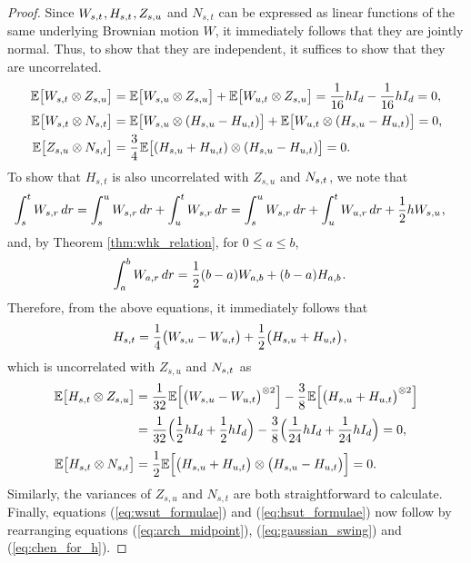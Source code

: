 \documentclass[sn-mathphys-num]{sn-jnl}%
\newcommand{\E}{\mathbb{E}}
\newcommand{\m}{\hspace{0.25mm}}
\begin{document}
\begin{proof}
Since $W_{s,t}\m, H_{s,t}\m, Z_{s,u}$ and $N_{s,t}$ can be expressed as linear functions of the same underlying Brownian motion $W$, it immediately follows that they are jointly normal. Thus, to show that they are independent, it suffices to show that they are uncorrelated.
\begin{align*}
\E\big[W_{s,t}\otimes Z_{s,u}\big] & = \E\big[W_{s,u}\otimes Z_{s,u}\big] +  \E\big[W_{u,t}\otimes Z_{s,u}\big] = \frac{1}{16}hI_d - \frac{1}{16}hI_d = 0,\\
\E\big[W_{s,t}\otimes N_{s,t}\big] & = \E\big[W_{s,u}\otimes (H_{s,u} - H_{u,t})\big] +  \E\big[W_{u,t}\otimes (H_{s,u} - H_{u,t})\big] = 0,\\
\E\big[Z_{s,u}\otimes N_{s,t}\big] & = \frac{3}{4}\m\E\big[(H_{s,u} + H_{u,t})\otimes (H_{s,u} - H_{u,t})\big] = 0.
\end{align*}
To show that $H_{s,t}$ is also uncorrelated with $Z_{s,u}$ and $N_{s,t}\m$, we note that
\begin{align*}
\int_s^t W_{s,r}\,dr & = \int_s^u W_{s,r}\,dr + \int_u^t W_{s,r}\,dr = \int_s^u W_{s,r}\,dr + \int_u^t W_{u,r}\,dr + \frac{1}{2}h W_{s,u}\m,
\end{align*}
and, by Theorem \ref{thm:whk_relation}, for $0\leq a\leq b$,
\begin{align*}
\int_a^b W_{a,r}\,dr & = \frac{1}{2}(b-a)W_{a,b} + (b-a)H_{a,b}\m.
\end{align*}
Therefore, from the above equations, it immediately follows that
\begin{align}
H_{s,t} & = \frac{1}{4}\big(W_{s,u} - W_{u,t}\big)+ \frac{1}{2}\big(H_{s,u} + H_{u,t}\big)\m,\label{eq:chen_for_h}
\end{align}
which is uncorrelated with $Z_{s,u}$ and $N_{s,t}\m$ as
\begin{align*}
\E\big[H_{s,t}\otimes Z_{s,u}\big] & = \frac{1}{32}\m\E\Big[\big(W_{s,u} - W_{u,t}\big)^{\otimes 2}\Big] - \frac{3}{8}\m\E\Big[\big(H_{s,u} + H_{u,t}\big)^{\otimes 2}\Big]\\[2pt]
& = \frac{1}{32}\Big(\frac{1}{2}h I_d + \frac{1}{2}h I_d\Big) - \frac{3}{8}\Big(\frac{1}{24}h I_d + \frac{1}{24}h I_d\Big) = 0,\\[3pt]
\E\big[H_{s,t}\otimes N_{s,t}\big] & = \frac{1}{2}\E\Big[\big(H_{s,u} + H_{u,t}\big)\otimes\big(H_{s,u} - H_{u,t}\big)\Big] = 0.
\end{align*}
Similarly, the variances of $Z_{s,u}$ and $N_{s,t}$ are both straightforward to calculate. Finally, equations (\ref{eq:wsut_formulae}) and (\ref{eq:hsut_formulae}) now follow by rearranging equations (\ref{eq:arch_midpoint}), (\ref{eq:gaussian_swing}) and (\ref{eq:chen_for_h}).
\end{proof}
\end{document}
